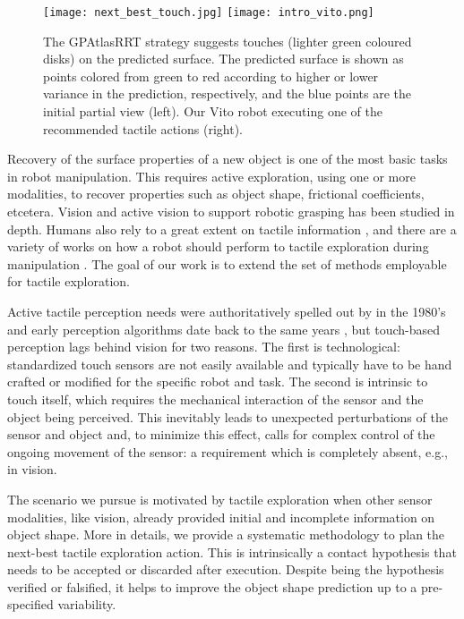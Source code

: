 \begin{figure*}
\centering
  \texttt{[image: next\_best\_touch.jpg]}
  \texttt{[image: intro\_vito.png]}
\caption{The GPAtlasRRT strategy suggests touches (lighter green coloured disks) on the predicted surface. The predicted surface is shown as points colored from green to red according to higher or lower variance in the prediction, respectively, and the blue points are the initial partial view (left). Our Vito robot executing one of the recommended tactile actions (right). }
\label{fig:setup_solution}
\end{figure*}

Recovery of the surface properties of a new object is one of the most basic tasks in robot manipulation. This requires active exploration, using one or more modalities, to recover properties such as object shape, frictional coefficients, etcetera. Vision and active vision to support robotic grasping \citep{Kragic2002TechRep,nunez2013models,arruda16,kopicki2015ijrr,kootstra2012a} has been studied in depth. Humans also rely to a great extent on tactile information \citep{johansson92}, and there are a variety of works on how a robot should perform to tactile exploration during manipulation \citep{zito2013sequential,jentoft2014a,Bjorkman2013Enhancing,Hebert2013Next,Petrovskaya2011Global}. The goal of our work is to extend the set of methods employable for tactile exploration.

Active tactile perception needs were authoritatively spelled out by \cite{Bajcsy1988Active} in the 1980's and early perception algorithms date back to the same years \citep{Grimson1984JRR,Faugeras1983IJCAI,Shekhar1986ICRA,Bajcsy1989Machine}, but touch-based perception lags behind vision for two reasons. The first is technological: standardized touch sensors are not easily available and typically have to be hand crafted or modified for the specific robot and task. The second is intrinsic to touch itself, which requires the mechanical interaction of the sensor and the object being perceived. This inevitably leads to unexpected perturbations of the sensor and object and, to minimize this effect, calls for complex control of the ongoing movement of the sensor: a requirement which is completely absent, e.g., in vision.

The scenario we pursue is motivated by tactile exploration when other sensor modalities, like vision, already provided initial and incomplete information on object shape. More in details, we provide a systematic methodology to plan the next-best tactile exploration action. This is intrinsically a contact hypothesis that needs to be accepted or discarded after execution. Despite being the hypothesis verified or falsified, it helps to improve the object shape prediction up to a pre-specified variability.

